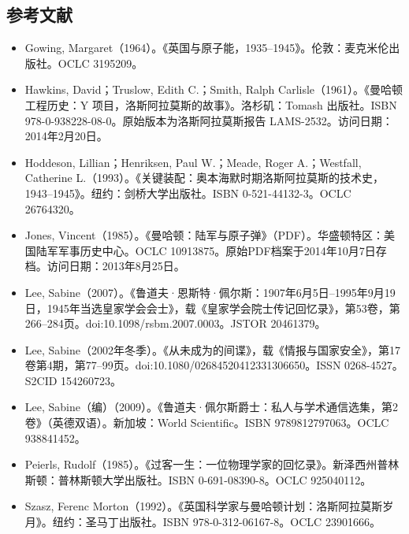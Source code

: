 \subsection{参考文献}
\begin{itemize}
\item Gowing, Margaret（1964）。《英国与原子能，1935–1945》。伦敦：麦克米伦出版社。OCLC 3195209。
\item Hawkins, David；Truslow, Edith C.；Smith, Ralph Carlisle（1961）。《曼哈顿工程历史：Y 项目，洛斯阿拉莫斯的故事》。洛杉矶：Tomash 出版社。ISBN 978-0-938228-08-0。原始版本为洛斯阿拉莫斯报告 LAMS-2532。访问日期：2014年2月20日。
\item Hoddeson, Lillian；Henriksen, Paul W.；Meade, Roger A.；Westfall, Catherine L.（1993）。《关键装配：奥本海默时期洛斯阿拉莫斯的技术史，1943–1945》。纽约：剑桥大学出版社。ISBN 0-521-44132-3。OCLC 26764320。
\item Jones, Vincent（1985）。《曼哈顿：陆军与原子弹》（PDF）。华盛顿特区：美国陆军军事历史中心。OCLC 10913875。原始PDF档案于2014年10月7日存档。访问日期：2013年8月25日。
\item Lee, Sabine（2007）。《鲁道夫·恩斯特·佩尔斯：1907年6月5日–1995年9月19日，1945年当选皇家学会会士》，载《皇家学会院士传记回忆录》，第53卷，第266–284页。doi:10.1098/rsbm.2007.0003。JSTOR 20461379。
\item Lee, Sabine（2002年冬季）。《从未成为的间谍》，载《情报与国家安全》，第17卷第4期，第77–99页。doi:10.1080/02684520412331306650。ISSN 0268-4527。S2CID 154260723。
\item Lee, Sabine（编）（2009）。《鲁道夫·佩尔斯爵士：私人与学术通信选集，第2卷》（英德双语）。新加坡：World Scientific。ISBN 9789812797063。OCLC 938841452。
\item Peierls, Rudolf（1985）。《过客一生：一位物理学家的回忆录》。新泽西州普林斯顿：普林斯顿大学出版社。ISBN 0-691-08390-8。OCLC 925040112。
\item Szasz, Ferenc Morton（1992）。《英国科学家与曼哈顿计划：洛斯阿拉莫斯岁月》。纽约：圣马丁出版社。ISBN 978-0-312-06167-8。OCLC 23901666。
\end{itemize}
